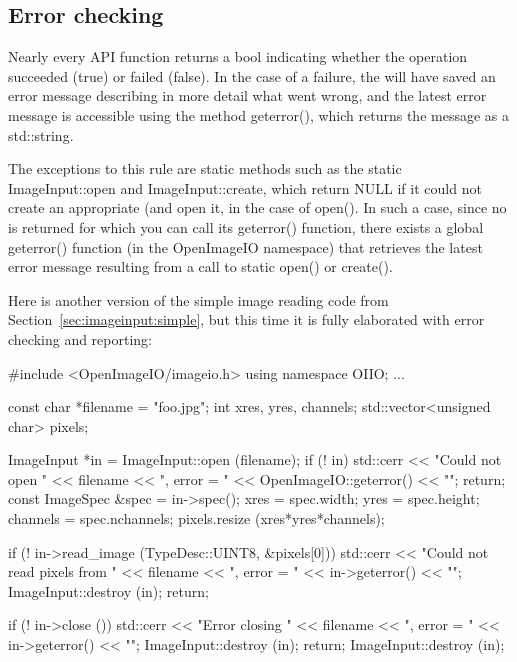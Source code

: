 \subsection{Error checking}
\label{sec:imageinput:errors}

Nearly every \ImageInput API function returns a {\cf bool} indicating
whether the operation succeeded ({\cf true}) or failed ({\cf false}).
In the case of a failure, the \ImageInput will have saved an error
message describing in more detail what went wrong, and the latest
error message is accessible using the \ImageInput method 
{\cf geterror()}, which returns the message as a {\cf std::string}.

The exceptions to this rule are static methods such as the static
{\cf ImageInput::open} and {\cf ImageInput::create}, which return
{\cf NULL} if it could not create an appropriate \ImageInput (and open
it, in the case of {\cf open()}.  In such a case,
since no \ImageInput is returned for which you can call its {\cf
  geterror()} function, there exists a global {\cf geterror()}
function (in the {\cf OpenImageIO} namespace) that retrieves the latest
error message resulting from a call to static {\cf open()} or {\cf create()}.

Here is another version of the simple image reading code from
Section~\ref{sec:imageinput:simple}, but this time it is fully
elaborated with error checking and reporting:

\begin{code}
        #include <OpenImageIO/imageio.h>
        using namespace OIIO;
        ...

        const char *filename = "foo.jpg";
        int xres, yres, channels;
        std::vector<unsigned char> pixels;

        ImageInput *in = ImageInput::open (filename);
        if (! in) {
            std::cerr << "Could not open " << filename 
                      << ", error = " << OpenImageIO::geterror() << "\n";
            return;
        }
        const ImageSpec &spec = in->spec();
        xres = spec.width;
        yres = spec.height;
        channels = spec.nchannels;
        pixels.resize (xres*yres*channels);

        if (! in->read_image (TypeDesc::UINT8, &pixels[0])) {
            std::cerr << "Could not read pixels from " << filename 
                      << ", error = " << in->geterror() << "\n";
            ImageInput::destroy (in);
            return;
        }

        if (! in->close ()) {
            std::cerr << "Error closing " << filename 
                      << ", error = " << in->geterror() << "\n";
            ImageInput::destroy (in);
            return;
        }
        ImageInput::destroy (in);
\end{code}


